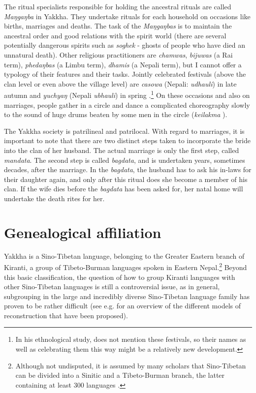 The ritual specialists responsible for holding the ancestral rituals are called \emph{Maŋgaŋba} in Yakkha. They undertake rituals for each household on occasions like births, marriages and deaths. The task of the \emph{Maŋgaŋbas} is to maintain the ancestral order and good relations with the spirit world (there are several potentially dangerous spirits such as \emph{soghek} - ghosts of people who have died an unnatural death). Other religious practitioners are \emph{chamwas},  \emph{bijuwas} (a Rai term), \emph{phedaŋbas} (a Limbu term), \emph{dhamis} (a Nepali term), but I cannot offer a typology of their features and their tasks. Jointly celebrated festivals (above the clan level or even above the village level) are \emph{casowa} (Nepali: \emph{udhauli}) in late autumn and \emph{yuchyaŋ} (Nepali \emph{ubhauli}) in spring \citep[102ff.]{Kongren2007Indigenous}.\footnote{In his ethnological study, \citet{Russell1992_Yakha}  does not mention these festivals, so their names as well as  celebrating them this way might be a relatively new development.} On these occasions and also on marriages, people gather in a circle and dance a complicated choreography slowly to the sound of huge drums beaten by some men in the circle (\emph{keilakma} ). 

The Yakkha society is patrilineal and patrilocal. With regard to marriages, it is important to note that there are two distinct steps taken to incorporate the bride into the clan of her husband. The actual marriage is only the first step, called \emph{mandata}. The second step is called \emph{bagdata}, and is undertaken years, sometimes decades, after the marriage. In the \emph{bagdata}, the husband has to ask his in-laws for their daughter again, and only after this ritual does she become a member of his clan. If the wife dies before the \emph{bagdata} has been asked for, her natal home will undertake the death rites for her.

 
\section{Genealogical affiliation}\label{genetic}

Yakkha is a Sino-Tibetan language, belonging to the Greater Eastern branch of Kiranti, a group of Tibeto-Burman languages spoken in Eastern Nepal.\footnote{Although not  undisputed, it is assumed by many scholars that Sino-Tibetan can be divided into a Sinitic and a Tibeto-Burman branch, the latter containing at least 300 languages \citep{Bradley1997_Tibeto-Burman, Matisoff2003Handbook}.}  Beyond this basic classification, the question of how to group Kiranti languages with other Sino-Tibetan languages is still a controversial issue, as in general, subgrouping in the large and incredibly diverse Sino-Tibetan language family has proven to be rather difficult (see e.g. \citealt[Chapter 3]{Hyslop2011_Kurtop} for an overview of the different models of reconstruction that have been proposed).

